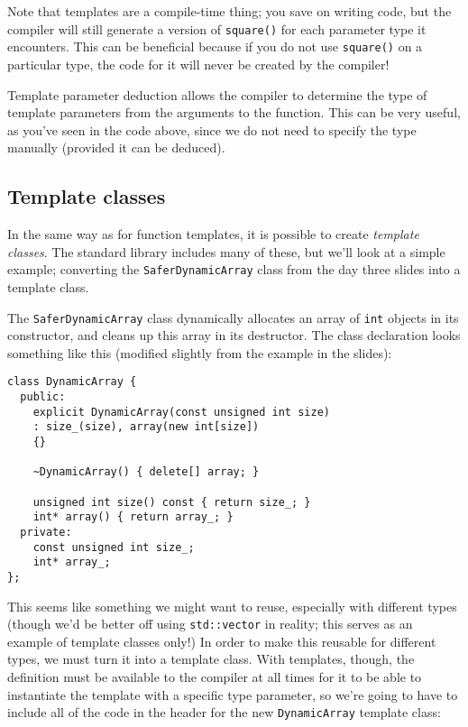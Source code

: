 \documentclass[a4paper]{scrartcl}
\begin{document}
Note that templates are a compile-time thing; you save on writing code, but the compiler will still generate a version of \verb|square()| for each parameter type it encounters. This can be beneficial because if you do not use \verb|square()| on a particular type, the code for it will never be created by the compiler!

Template parameter deduction allows the compiler to determine the type of template parameters from the arguments to the function. This can be very useful, as you've seen in the code above, since we do not need to specify the type manually (provided it can be deduced).

\subsection{Template classes}
In the same way as for function templates, it is possible to create \emph{template classes}. The standard library includes many of these, but we'll look at a simple example; converting the \verb|SaferDynamicArray| class from the day three slides into a template class.

The \verb|SaferDynamicArray| class dynamically allocates an array of \verb|int| objects in its constructor, and cleans up this array in its destructor. The class declaration looks something like this (modified slightly from the example in the slides):

\begin{verbatim}
class DynamicArray {
  public:
    explicit DynamicArray(const unsigned int size)
    : size_(size), array(new int[size])
    {}

    ~DynamicArray() { delete[] array; }
    
    unsigned int size() const { return size_; }
    int* array() { return array_; }
  private:
    const unsigned int size_;
    int* array_;
};
\end{verbatim}

This seems like something we might want to reuse, especially with different types (though we'd be better off using \verb|std::vector| in reality; this serves as an example of template classes only!) In order to make this reusable for different types, we must turn it into a template class. With templates, though, the definition must be available to the compiler at all times for it to be able to instantiate the template with a specific type parameter, so we're going to have to include all of the code in the header for the new \verb|DynamicArray| template class:
\end{document}
